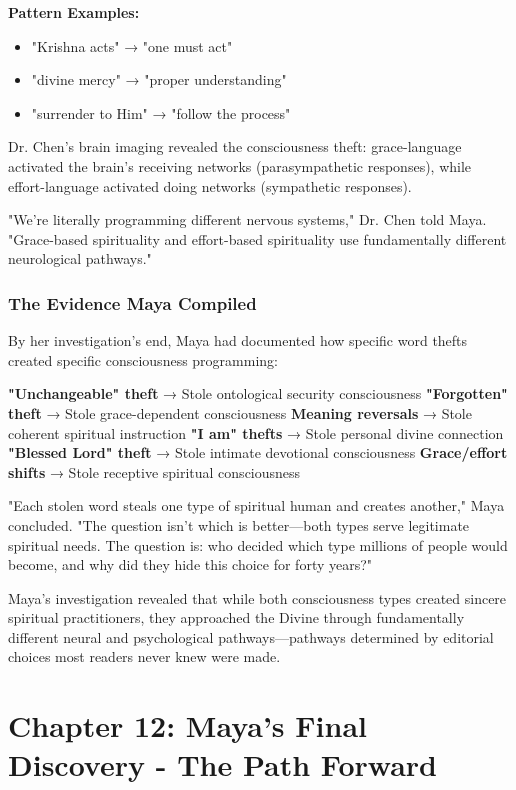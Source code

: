 \documentclass[11pt,twoside]{book}
\begin{document}
\textbf{\textbf{Pattern Examples:}}
\begin{itemize}
\item "Krishna acts" → "one must act"
\item "divine mercy" → "proper understanding"
\item "surrender to Him" → "follow the process"
\end{itemize}

Dr. Chen's brain imaging revealed the consciousness theft: grace-language activated the brain's receiving networks (parasympathetic responses), while effort-language activated doing networks (sympathetic responses).

"We're literally programming different nervous systems," Dr. Chen told Maya. "Grace-based spirituality and effort-based spirituality use fundamentally different neurological pathways."
\section*{The Evidence Maya Compiled}
\label{sec:org2dd356d}

By her investigation's end, Maya had documented how specific word thefts created specific consciousness programming:

\textbf{\textbf{"Unchangeable" theft}} → Stole ontological security consciousness
\textbf{\textbf{"Forgotten" theft}} → Stole grace-dependent consciousness  
\textbf{\textbf{Meaning reversals}} → Stole coherent spiritual instruction
\textbf{\textbf{"I am" thefts}} → Stole personal divine connection
\textbf{\textbf{"Blessed Lord" theft}} → Stole intimate devotional consciousness
\textbf{\textbf{Grace/effort shifts}} → Stole receptive spiritual consciousness

"Each stolen word steals one type of spiritual human and creates another," Maya concluded. "The question isn't which is better—both types serve legitimate spiritual needs. The question is: who decided which type millions of people would become, and why did they hide this choice for forty years?"

Maya's investigation revealed that while both consciousness types created sincere spiritual practitioners, they approached the Divine through fundamentally different neural and psychological pathways—pathways determined by editorial choices most readers never knew were made.
\part*{Chapter 12: Maya's Final Discovery - The Path Forward}
\label{sec:orgbedc537}
\end{document}
